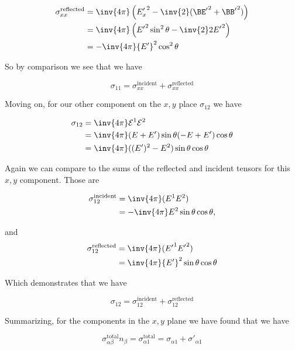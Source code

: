 \begin{align*}
{\sigma}_{x x}^{\text{reflected}} 
&= \inv{4 \pi} \left( 
{E_x'}^2 - \inv{2} ({\BE'}^2 + {\BB'}^2)
\right) \\
&= \inv{4 \pi} \left( 
{E'}^2 \sin^2 \theta - \inv{2} 2 {E'}^2 
\right) \\
&= -\inv{4 \pi} {E'}^2 \cos^2\theta
\end{align*}

So by comparison we see that we have

\begin{equation}\label{eqn:relativisticElectrodynamicsT9:620}
\sigma_{1 1} = {\sigma}_{x x}^{\text{incident}} +{\sigma}_{x x}^{\text{reflected}} 
\end{equation}

Moving on, for our other component on the $x,y$ place $\sigma_{12}$ we have

\begin{align*}
\sigma_{12} 
&= \inv{4 \pi} \mathcal{E}^1 \mathcal{E}^2 \\
&= \inv{4 \pi} (E + E') \sin\theta (-E + E') \cos\theta \\
&= \inv{4 \pi} ((E')^2 - E^2) \sin\theta \cos\theta 
\end{align*}

Again we can compare to the sums of the reflected and incident tensors for this $x,y$ component.  Those are

\begin{align*}
\sigma_{12}^{\text{incident}} 
&= 
\inv{4 \pi} ( E^1 E^2 ) \\
&= 
-\inv{4 \pi} E^2 \sin\theta \cos\theta,
\end{align*}

and
\begin{align*}
\sigma_{12}^{\text{reflected}} 
&= 
\inv{4 \pi} ( {E'}^1 {E'}^2 ) \\
&= 
\inv{4 \pi} {E'}^2 \sin\theta \cos\theta
\end{align*}

Which demonstrates that we have

\begin{equation}\label{eqn:relativisticElectrodynamicsT9:640}
\sigma_{12} = \sigma_{12}^{\text{incident}} + \sigma_{12}^{\text{reflected}} 
\end{equation}

Summarizing, for the components in the $x,y$ plane we have found that we have

\begin{equation}\label{eqn:relativisticElectrodynamicsT9:210}
\sigma_{\alpha\beta}^{\text{total}} n_\beta = \sigma_{\alpha 1 }^{\text{total}} = \sigma_{\alpha 1} + {\sigma'}_{\alpha 1}
\end{equation}

